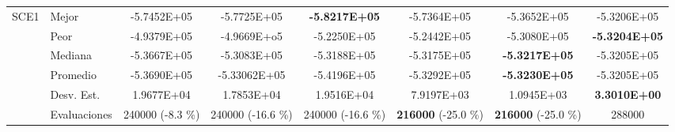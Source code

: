 \begin{table}
{\begin{tabular}{clcccccc}
			
			
			
			
			\hline
			\multirow{6}{*}{SCE1} & Mejor       & -5.7452E+05    & -5.7725E+05    & \textbf{-5.8217E+05}   &-5.7364E+05   & -5.3652E+05   &-5.3206E+05 \\
			& Peor        &-4.9379E+05     & -4.9669E+o5   & -5.2250E+05   & -5.2442E+05  & -5.3080E+05  & \textbf{-5.3204E+05} \\
			& Mediana     &-5.3667E+05    &-5.3083E+05   & -5.3188E+05   & -5.3175E+05   & \textbf{-5.3217E+05}  & -5.3205E+05   \\
			& Promedio    &-5.3690E+05   &-5.33062E+05   & -5.4196E+05   & -5.3292E+05   & \textbf{-5.3230E+05 }  & -5.3205E+05 \\
			& Desv. Est.  &1.9677E+04  & 1.7853E+04    & 1.9516E+04   & 7.9197E+03   & 1.0945E+03  & \textbf{3.3010E+00 } \\
			& Evaluaciones&240000 (-8.3 \%) & 240000 (-16.6 \%)  & 240000 (-16.6 \%)   & \textbf{216000} (-25.0 \%) & \textbf{216000} (-25.0 \%)&288000
			
			
			
			
			
		\end{tabular}
	}
\end{table}
